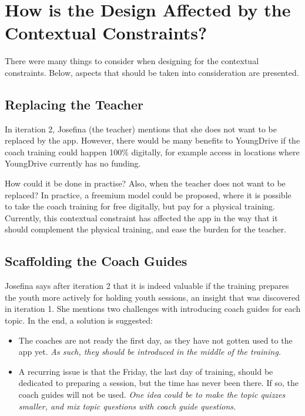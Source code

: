 \section{How is the Design Affected by the Contextual Constraints?}

There were many things to consider when designing for the contextual constraints. Below, aspects that should be taken into consideration are presented.

\subsection{Replacing the Teacher}
In iteration 2, Josefina (the teacher) mentions that she does not want to be replaced by the app. However, there would be many benefits to YoungDrive if the coach training could happen 100\% digitally, for example access in locations where YoungDrive currently has no funding.

How could it be done in practise? Also, when the teacher does not want to be replaced? In practice, a freemium model could be proposed, where it is possible to take the coach training for free digitally, but pay for a physical training. Currently, this contextual constraint has affected the app in the way that it should complement the physical training, and ease the burden for the teacher.

\subsection{Scaffolding the Coach Guides}
Josefina says after iteration 2 that it is indeed valuable if the training prepares the youth more actively for holding youth sessions, an insight that was discovered in iteration 1. She mentions two challenges with introducing coach guides for each topic. In the end, a solution is suggested:

\begin{itemize}
\item The coaches are not ready the first day, as they have not gotten used to the app yet. \textit{As such, they should be introduced in the middle of the training.}
\item A recurring issue is that the Friday, the last day of training, should be dedicated to preparing a session, but the time has never been there. If so, the coach guides will not be used. \textit{One idea could be to make the topic quizzes smaller, and mix topic questions with coach guide questions.}
\end{itemize}

